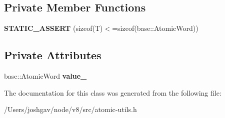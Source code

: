 \subsection*{Private Member Functions}
\begin{DoxyCompactItemize}
\item 
{\bfseries S\+T\+A\+T\+I\+C\+\_\+\+A\+S\+S\+E\+RT} (sizeof(T)$<$=sizeof(base\+::\+Atomic\+Word))\hypertarget{classv8_1_1internal_1_1_atomic_value_a8a5b7e77ab1d7f8c2806016798ac6ef3}{}\label{classv8_1_1internal_1_1_atomic_value_a8a5b7e77ab1d7f8c2806016798ac6ef3}

\end{DoxyCompactItemize}
\subsection*{Private Attributes}
\begin{DoxyCompactItemize}
\item 
base\+::\+Atomic\+Word {\bfseries value\+\_\+}\hypertarget{classv8_1_1internal_1_1_atomic_value_ae9785652b5da56fe3daf796a8c12a58f}{}\label{classv8_1_1internal_1_1_atomic_value_ae9785652b5da56fe3daf796a8c12a58f}

\end{DoxyCompactItemize}


The documentation for this class was generated from the following file\+:\begin{DoxyCompactItemize}
\item 
/\+Users/joshgav/node/v8/src/atomic-\/utils.\+h\end{DoxyCompactItemize}
